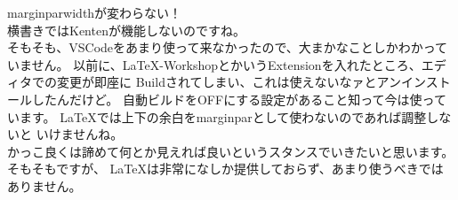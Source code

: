 \documentclass[a6paper,landscape,11pt]{ltjtarticle}
\begin{document}
marginparwidthが変わらない！\\
横書きではKentenが機能しないのですね。\\
そもそも、VSCodeをあまり使って来なかったので、大まかなことしかわかっていません。
以前に、\LaTeX-WorkshopとかいうExtensionを入れたところ、エディタでの変更が即座に
Buildされてしまい、これは使えないなァとアンインストールしたんだけど。
自動ビルドをOFFにする設定があること知って今は使っています。
\LaTeX では上下の余白をmarginparとして使わないのであれば調整しないと
いけませんね。\\
かっこ良くは諦めて何とか見えれば良いというスタンスでいきたいと思います。\\
そもそもですが、
 \LaTeX は非常になしか提供しておらず、あまり使うべきではありません。
\end{document}
